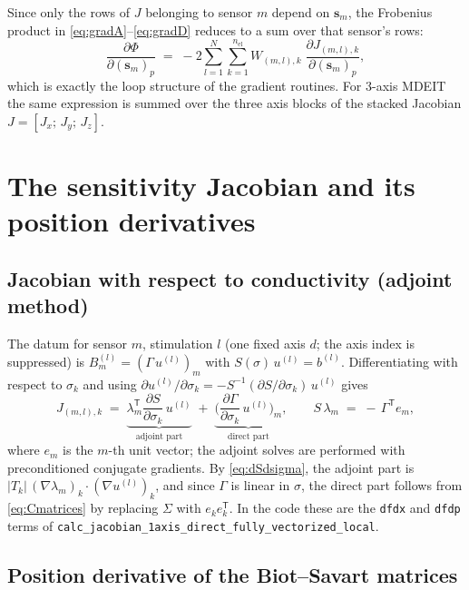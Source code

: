 \documentclass[11pt,a4paper]{article}
\newcommand{\T}{\mathsf{T}}
\newcommand{\sensor}[1]{\bm{s}_{#1}}
\newcommand{\code}[1]{\texttt{#1}}
\begin{document}
Since only the rows of $J$ belonging to sensor $m$ depend on $\sensor{m}$, the Frobenius product
in \eqref{eq:gradA}--\eqref{eq:gradD} reduces to a sum over that sensor's rows:
\begin{equation}
  \frac{\partial \Phi}{\partial (\sensor{m})_p}
  \;=\;
  -2 \sum_{l=1}^{N} \sum_{k=1}^{n_{\mathrm{el}}}
     W_{(m,l),k}\; \frac{\partial J_{(m,l),k}}{\partial (\sensor{m})_p},
\end{equation}
which is exactly the loop structure of the gradient routines. For 3-axis MDEIT the same
expression is summed over the three axis blocks of the stacked Jacobian
$J = [J_x;\, J_y;\, J_z]$.

\section{The sensitivity Jacobian and its position derivatives}

\subsection{Jacobian with respect to conductivity (adjoint method)}

The datum for sensor $m$, stimulation $l$ (one fixed axis $d$; the axis index is suppressed) is
$B_m^{(l)} = (\Gamma\, u^{(l)})_m$ with $S(\sigma)\, u^{(l)} = b^{(l)}$. Differentiating with
respect to $\sigma_k$ and using
$\partial u^{(l)}/\partial \sigma_k = -S^{-1} (\partial S/\partial \sigma_k)\, u^{(l)}$ gives
\begin{equation}
  J_{(m,l),k}
  \;=\;
  \underbrace{\lambda_m^\T \frac{\partial S}{\partial \sigma_k}\, u^{(l)}}_{\text{adjoint part}}
  \;+\;
  \underbrace{\Big( \frac{\partial \Gamma}{\partial \sigma_k}\, u^{(l)} \Big)_{\!m}}_{\text{direct part}},
  \qquad
  S\, \lambda_m \;=\; -\,\Gamma^\T e_m ,
\end{equation}
where $e_m$ is the $m$-th unit vector; the adjoint solves are performed with preconditioned
conjugate gradients. By \eqref{eq:dSdsigma}, the adjoint part is
$|T_k|\, (\nabla \lambda_m)_k \cdot (\nabla u^{(l)})_k$, and since $\Gamma$ is linear in
$\sigma$, the direct part follows from \eqref{eq:Cmatrices} by replacing $\Sigma$ with
$e_k e_k^\T$. In the code these are the \code{dfdx} and \code{dfdp} terms of
\code{calc\_jacobian\_1axis\_direct\_fully\_vectorized\_local}.

\subsection{Position derivative of the Biot--Savart matrices}
\end{document}
